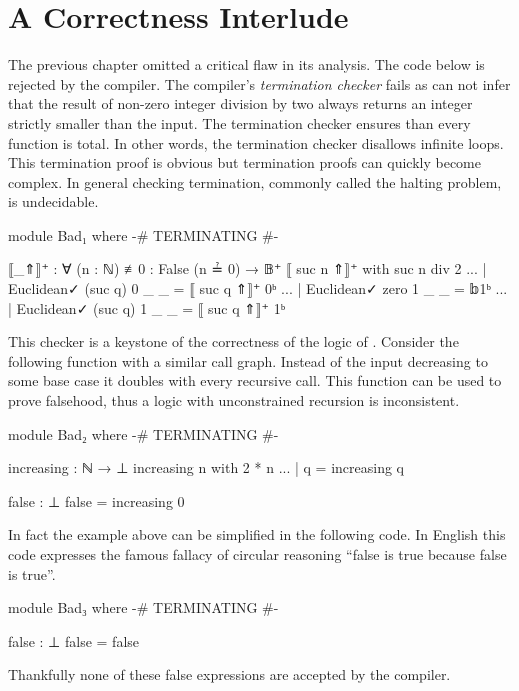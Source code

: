 \documentclass[./Thesis.tex]{subfiles}
\begin{document}
\section{A Correctness Interlude}
\label{sec:a-correctness-interlude}
The previous chapter omitted a critical flaw in its analysis. The code below is
rejected by the \Agda{} compiler. The compiler's \textit{termination checker} \cite{agda}
fails as \Agda{} can not infer that the result of non-zero integer division by
two always returns an integer strictly smaller than the input. The termination
checker ensures than every function is total. In other words,
the termination checker disallows infinite loops. This termination proof
is obvious but termination proofs can quickly become complex. In general checking
termination, commonly called the halting problem, is undecidable. 
\begin{code}[hide]
  module Bad₁ where
    {-# TERMINATING #-}
\end{code}
\begin{code}
    ⟦_⇑⟧⁺ : ∀ (n : ℕ) {≢0 : False (n ≟ 0)} → 𝔹⁺
    ⟦ suc n ⇑⟧⁺ with suc n div 2
    ... | Euclidean✓ (suc q) 0 _ _ = ⟦ suc q ⇑⟧⁺ 0ᵇ
    ... | Euclidean✓ zero    1 _ _ = 𝕓1ᵇ
    ... | Euclidean✓ (suc q) 1 _ _ = ⟦ suc q ⇑⟧⁺ 1ᵇ
\end{code}
This checker is a keystone of the correctness of the logic of \Agda{}. Consider
the following function with a similar call graph. Instead of the input
decreasing to some base case it doubles with every recursive call. This function can
be used to prove falsehood, thus a logic with unconstrained recursion is
inconsistent.
\begin{code}[hide]
  module Bad₂ where
    {-# TERMINATING #-}
\end{code}
\begin{code}
    increasing : ℕ → ⊥
    increasing n with 2 * n
    ... | q = increasing q

    false : ⊥
    false = increasing 0
\end{code}
In fact the example above can be simplified in the following code. In English
this code expresses the famous fallacy of circular reasoning ``false is true
because false is true''.
\begin{code}[hide]
  module Bad₃ where
    {-# TERMINATING #-}
\end{code}
\begin{code}
    false : ⊥
    false = false
\end{code}
Thankfully none of these false expressions are accepted by the \Agda{} compiler.
\end{document}
